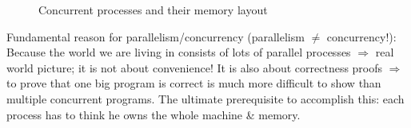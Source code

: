 {\begin{figure}[H]
		\caption{Concurrent processes and their memory layout}
		\label{fig:concurrprocsmemlayout}
	\end{figure}
}

\par{
	\noindent
	Fundamental reason for parallelism/concurrency (parallelism $\not=$ concurrency!): \newline
	Because the world we are living in consists of lots of parallel processes $\Rightarrow$ real world picture; it is not about convenience! It is also about correctness proofs $\Rightarrow$ to prove that one big program is correct is much more difficult to show than multiple concurrent programs. \newline
	The ultimate prerequisite to accomplish this: each process has to think he owns the whole machine \& memory.
}

